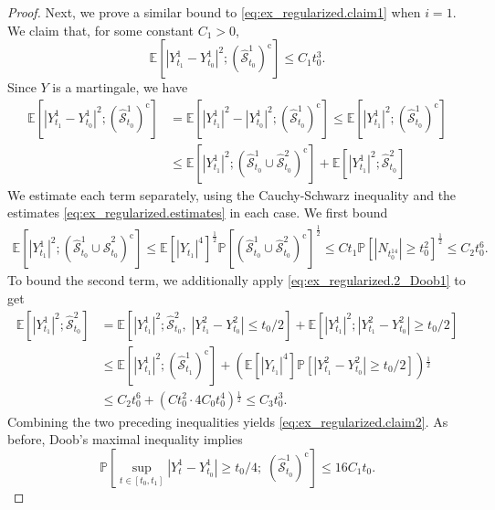 \documentclass[10pt,a4paper]{amsart}
\def\E{{\mathbb E}}
\def\P{{\mathbb P}}
\newcommand{\Scc}{\hat{\mathcal S}}
\begin{document}
\begin{proof}
    Next, we prove a similar bound to \eqref{eq:ex_regularized.claim1} when $i = 1$. We claim that, for some constant $C_1 > 0$,
    \begin{equation}
        \label{eq:ex_regularized.claim2}
        \E[|Y_{t_1}^1 - Y_{t_0}^1|^2 ; (\Scc^1_{t_0})^\textrm{c}] \le C_1 t_0^3.
    \end{equation}
    Since $Y$ is a martingale, we have
    \begin{equation}
	    \begin{split}
	    	\E[|Y_{t_1}^1 - Y_{t_0}^1|^2 ; (\Scc^1_{t_0})^\textrm{c}] & = \E[|Y^1_{t_1}|^2 - |Y^1_{t_0}|^2;(\Scc^1_{t_0})^\textrm{c}] \leq \E[|Y^1_{t_1}|^2 ;(\Scc^1_{t_0})^\textrm{c}]\\
	    	& \leq \E[|Y^1_{t_1}|^2 ;(\Scc^1_{t_0} \cup \Scc^2_{t_0})^\textrm{c}] + \E[|Y^1_{t_1}|^2 ;\Scc^2_{t_0}]
	    \end{split}
    \end{equation}
    We estimate each term separately, using the Cauchy-Schwarz inequality and the estimates \eqref{eq:ex_regularized.estimates} in each case. We first bound
    \begin{align}
        \E[|Y_{t_1}^1|^2 ; (\Scc^1_{t_0} \cup \Scc^2_{t_0})^\textrm{c}]
        \le
        \E[|Y_{t_1}|^4]^\frac12 \P[ (\Scc^1_{t_0} \cup \Scc^2_{t_0})^\textrm{c} ]^\frac{1}{2} 
        \le C t_1 \P[ |N_{t^{14}_0}| \ge t_0^2]^\frac12 \le C_2 t_0^{6}.
    \end{align}
    To bound the second term, we additionally apply \eqref{eq:ex_regularized.2_Doob1} to get
    \begin{align}
        \E[|Y_{t_1}^1|^2 ;\Scc^2_{t_0} ]
        &=
        \E[|Y_{t_1}^1|^2 ;\Scc^2_{t_0}, \; |Y^2_{t_1} - Y^2_{t_0}| \le t_0 / 2 ] +
        \E[|Y_{t_1}^1|^2 ;|Y^2_{t_1} - Y^2_{t_0}| \ge t_0 / 2]
        \\
        &\le
        \E[|Y_{t_1}^1|^2 ;(\Scc^1_{t_1})^\textrm{c}] + \!\left( \E[ |Y_{t_1}|^4 ] \P[ |Y_{t_1}^2 - Y_{t_0}^2| \ge t_0 / 2] \right)\!^\frac12
        \\
        &\le
        C_2 t_0^6 + \!\left( C t_0^2 \cdot 4 C_0 t_0^4 \right)\!^\frac12 \le C_3 t_0^3.
    \end{align}   
    Combining the two preceding inequalities yields \eqref{eq:ex_regularized.claim2}.
   	As before, Doob's maximal inequality implies
    \begin{equation}
        \label{eq:ex_regularized.2_Doob2}
        \P[\sup_{t \in [t_0,t_1]} |Y_t^1 - Y_{t_0}^1| \ge t_0 / 4; \; (\Scc^1_{t_0})^\textrm{c}] \le 16 C_1 t_0.    
    \end{equation}
    

\end{proof}
\end{document}
